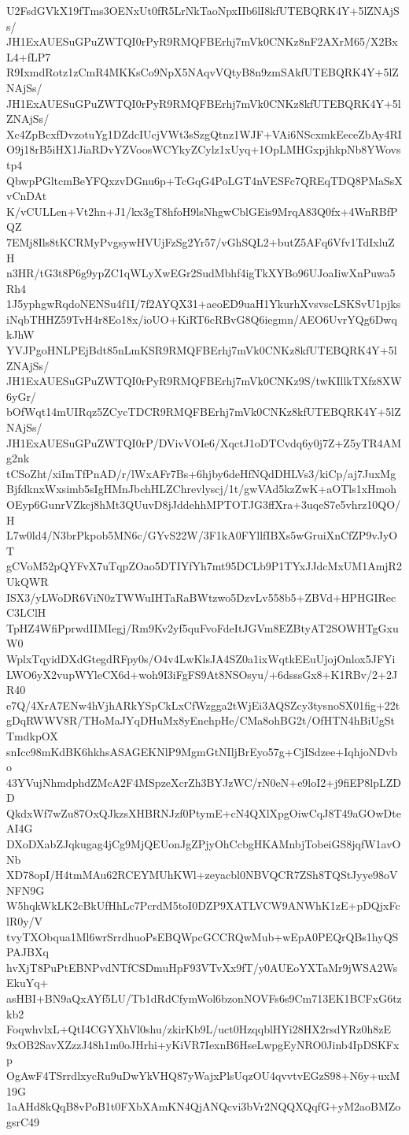 U2FsdGVkX19fTms3OENxUt0fR5LrNkTaoNpxIIb6lI8kfUTEBQRK4Y+5lZNAjSs/
JH1ExAUESuGPuZWTQI0rPyR9RMQFBErhj7mVk0CNKz8nF2AXrM65/X2BxL4+fLP7
R9IxmdRotz1zCmR4MKKsCo9NpX5NAqvVQtyB8n9zmSAkfUTEBQRK4Y+5lZNAjSs/
JH1ExAUESuGPuZWTQI0rPyR9RMQFBErhj7mVk0CNKz8kfUTEBQRK4Y+5lZNAjSs/
Xc4ZpBcxfDvzotuYg1DZdcIUcjVWt3sSzgQtnz1WJF+VAi6NScxmkEeceZbAy4RI
O9j18rB5iHX1JiaRDvYZVoosWCYkyZCylz1xUyq+1OpLMHGxpjhkpNb8YWovstp4
QbwpPGltcmBeYFQxzvDGnu6p+TcGqG4PoLGT4nVESFc7QREqTDQ8PMaSsXvCnDAt
K/vCULLen+Vt2hn+J1/kx3gT8hfoH9lsNhgwCblGEis9MrqA83Q0fx+4WnRBfPQZ
7EMj8Ils8tKCRMyPvgsywHVUjFzSg2Yr57/vGhSQL2+butZ5AFq6Vfv1TdIxluZH
n3HR/tG3t8P6g9ypZC1qWLyXwEGr2SudMbhf4igTkXYBo96UJoaIiwXnPuwa5Rh4
1J5yphgwRqdoNENSu4f1I/7f2AYQX31+aeoED9uaH1YkurhXvsvscLSKSvU1pjks
iNqbTHHZ59TvH4r8Eo18x/ioUO+KiRT6cRBvG8Q6iegmn/AEO6UvrYQg6DwqkJhW
YVJPgoHNLPEjBdt85nLmKSR9RMQFBErhj7mVk0CNKz8kfUTEBQRK4Y+5lZNAjSs/
JH1ExAUESuGPuZWTQI0rPyR9RMQFBErhj7mVk0CNKz9S/twKIllkTXfz8XW6yGr/
bOfWqt14mUIRqz5ZCycTDCR9RMQFBErhj7mVk0CNKz8kfUTEBQRK4Y+5lZNAjSs/
JH1ExAUESuGPuZWTQI0rP/DVivVOIe6/XqctJ1oDTCvdq6y0j7Z+Z5yTR4AMg2nk
tCSoZht/xiImTfPnAD/r/lWxAFr7Bs+6hjby6deHfNQdDHLVs3/kiCp/aj7JuxMg
BjfdknxWxsimb5sIgHMnJbchHLZChrevlyscj/1t/gwVAd5kzZwK+aOTls1xHmoh
OEyp6GunrVZkcj8hMt3QUuvD8jJddehhMPTOTJG3ffXra+3uqeS7e5vhrz10QO/H
L7w0ld4/N3brPkpob5MN6c/GYvS22W/3F1kA0FYllfIBXs5wGruiXnCfZP9vJyOT
gCVoM52pQYFvX7uTqpZOao5DTIYfYh7mt95DCLb9P1TYxJJdcMxUM1AmjR2UkQWR
ISX3/yLWoDR6ViN0zTWWuIHTaRaBWtzwo5DzvLv558b5+ZBVd+HPHGIRecC3LClH
TpHZ4WfiPprwdIIMIegj/Rm9Kv2yf5quFvoFdeItJGVm8EZBtyAT2SOWHTgGxuW0
WplxTqyidDXdGtegdRFpy0s/O4v4LwKlsJA4SZ0a1ixWqtkEEuUjojOnlox5JFYi
LWO6yX2vupWYleCX6d+woh9I3iFgFS9At8NSOsyu/+6dsssGx8+K1RBv/2+2JR40
e7Q/4XrA7ENw4hVjhARkYSpCkLxCfWzgga2tWjEi3AQSZcy3tysnoSX01fig+22t
gDqRWWV8R/THoMaJYqDHuMx8yEnehpHe/CMa8ohBG2t/OfHTN4hBiUgStTmdkpOX
snIcc98mKdBK6hkhsASAGEKNlP9MgmGtNIljBrEyo57g+CjISdzee+IqhjoNDvbo
43YVujNhmdphdZMcA2F4MSpzeXcrZh3BYJzWC/rN0eN+e9loI2+j9fiEP8lpLZDD
QkdxWf7wZu87OxQJkzsXHBRNJzf0PtymE+cN4QXlXpgOiwCqJ8T49aGOwDteAI4G
DXoDXabZJqkugag4jCg9MjQEUonJgZPjyOhCcbgHKAMnbjTobeiGS8jqfW1avONb
XD78opI/H4tmMAu62RCEYMUhKWl+zeyacbl0NBVQCR7ZSh8TQStJyye98oVNFN9G
W5hqkWkLK2cBkUfHhLc7PcrdM5toI0DZP9XATLVCW9ANWhK1zE+pDQjxFclR0y/V
tvyTXObqua1Ml6wrSrrdhuoPsEBQWpcGCCRQwMub+wEpA0PEQrQBs1hyQSPAJBXq
hvXjT8PuPtEBNPvdNTfCSDmuHpF93VTvXx9fT/y0AUEoYXTaMr9jWSA2WsEkuYq+
asHBI+BN9aQxAYf5LU/Tb1dRdCfymWol6bzonNOVFs6s9Cm713EK1BCFxG6tzkb2
FoqwhvlxL+QtI4CGYXhVl0shu/zkirKb9L/uct0HzqqblHYi28HX2rsdYRz0h8zE
9xOB2SavXZzzJ48h1m0oJHrhi+yKiVR7IexnB6HseLwpgEyNRO0Jinb4IpDSKFxp
OgAwF4TSrrdlxycRu9uDwYkVHQ87yWajxPlsUqzOU4qvvtvEGzS98+N6y+uxM19G
1aAHd8kQqB8vPoB1t0FXbXAmKN4QjANQcvi3bVr2NQQXQqfG+yM2aoBMZogsrC49
